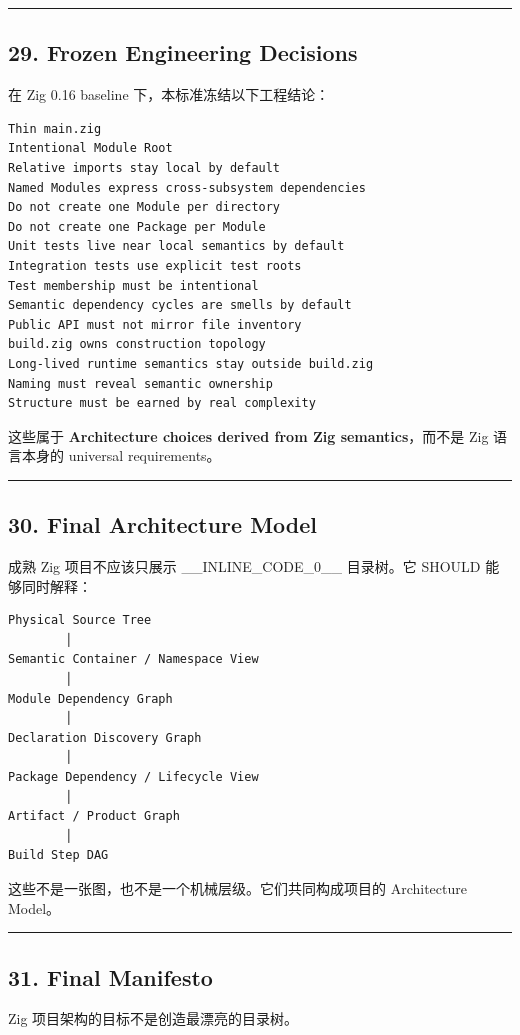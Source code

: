 \documentclass[11pt,a4paper]{article}
\begin{document}
\vspace{0.5em}\hrule\vspace{0.5em}
\subsection{29. Frozen Engineering Decisions}
在 Zig 0.16 baseline 下，本标准冻结以下工程结论：

\begin{lstlisting}[language=text]
Thin main.zig
Intentional Module Root
Relative imports stay local by default
Named Modules express cross-subsystem dependencies
Do not create one Module per directory
Do not create one Package per Module
Unit tests live near local semantics by default
Integration tests use explicit test roots
Test membership must be intentional
Semantic dependency cycles are smells by default
Public API must not mirror file inventory
build.zig owns construction topology
Long-lived runtime semantics stay outside build.zig
Naming must reveal semantic ownership
Structure must be earned by real complexity
\end{lstlisting}
这些属于 \textbf{Architecture choices derived from Zig semantics}，而不是 Zig 语言本身的 universal requirements。

\vspace{0.5em}\hrule\vspace{0.5em}
\subsection{30. Final Architecture Model}
成熟 Zig 项目不应该只展示 \_\_INLINE\_CODE\_0\_\_ 目录树。它 SHOULD 能够同时解释：

\begin{lstlisting}[language=text]
Physical Source Tree
        │
Semantic Container / Namespace View
        │
Module Dependency Graph
        │
Declaration Discovery Graph
        │
Package Dependency / Lifecycle View
        │
Artifact / Product Graph
        │
Build Step DAG
\end{lstlisting}
这些不是一张图，也不是一个机械层级。它们共同构成项目的 Architecture Model。

\vspace{0.5em}\hrule\vspace{0.5em}
\subsection{31. Final Manifesto}
Zig 项目架构的目标不是创造最漂亮的目录树。
\end{document}
